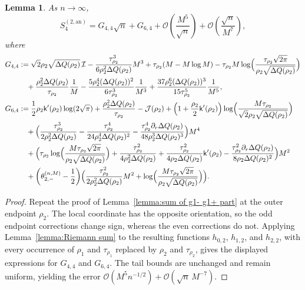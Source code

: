 \documentclass[a4paper]{article}
\newtheorem{lemma}[theorem]{Lemma}
\numberwithin{equation}{section}
\begin{document}
\begin{lemma}\label{lemma:sum of g2- part g2+part}
As $n\to\infty$,
\begin{equation}
 S_4^{(2,\mathrm{an})}
 =
 G_{4,4}\sqrt{n}+G_{6,4}+\mathcal{O}(\frac{M^5}{\sqrt{n}})+\mathcal{O}(\frac{\sqrt{n}}{M^7}),
\end{equation}
where 
\begin{align*}
G_{4,4}&:=    
\sqrt{2}\rho_2\sqrt{\Delta Q(\rho_2)}\,\mathcal{I}
-\frac{\tau_{\rho_2}^3}{6\rho_2^2\Delta Q(\rho_2)}M^3
+\tau_{\rho_2}(M-M\log M)-\tau_{\rho_2}M\log\Bigl(\frac{\tau_{\rho_2}\sqrt{2\pi}}{\rho_2\sqrt{\Delta Q(\rho_2)}}\Bigr)
\\
&\quad 
+\frac{\rho_2^2\Delta Q(\rho_2)}{\tau_{\rho_2}}\frac{1}{M}
-\frac{5\rho_2^4(\Delta Q(\rho_2))^2}{6\tau_{\rho_2}^3}\frac{1}{M^3}
+\frac{37\rho_2^6(\Delta Q(\rho_2))^3}{15\tau_{\rho_2}^5}\frac{1}{M^5},
\\
G_{6,4}&:=
\frac{1}{2}\rho_2\mathsf{k}'(\rho_2)\log(2\sqrt{\pi})
+
\frac{\rho_2^2\Delta Q(\rho_2)}{\tau_{\rho_2}}
-\mathcal{J}(\rho_2)
+
\Bigl( 
1+\frac{\rho_2}{2}\mathsf{k}'(\rho_2)
\Bigr)
\log\Bigl(\frac{M\tau_{\rho_2}}{\sqrt{2}\rho_2\sqrt{\Delta Q(\rho_2)}}\Bigr)
\\
&\quad
+\Bigl(
\frac{\tau_{\rho_2}^3}{2\rho_2^2\Delta Q(\rho_2)}
-\frac{\tau_{\rho_2}^4}{24\rho_2^4\Delta Q(\rho_2)^2}
-\frac{\tau_{\rho_2}^4\partial_r\Delta Q(\rho_2)}{48\rho_2^3\Delta Q(\rho_2)^3}
\Bigr)M^4
\\
&\quad
+\Bigl( 
\tau_{\rho_2}\log\Bigl(\frac{M\tau_{\rho_2}\sqrt{2\pi}}{\rho_2\sqrt{\Delta Q(\rho_2)}}\Bigr)
+\frac{\tau_{\rho_2}^2}{4\rho_2^2\Delta Q(\rho_2)}
+\frac{\tau_{\rho_2}^2}{4\rho_2\Delta Q(\rho_2)}\mathsf{k}'(\rho_2)
-\frac{\tau_{\rho_2}^2\partial_r\Delta Q(\rho_2)}{8\rho_2\Delta Q(\rho_2)^2}
\Bigr)M^2
\\
&\quad
+\bigg(\theta_{2,-}^{(n,M)} -\frac{1}{2} \bigg)
\Bigl(\frac{\tau_{\rho_2}^2}{2\rho_2^2\Delta Q(\rho_2)}M^2
+\log\Bigl(\frac{M\tau_{\rho_2}\sqrt{2\pi}}{\rho_2\sqrt{\Delta Q(\rho_2)}}\Bigr)\Bigr).
\end{align*}

\end{lemma}


\begin{proof}
Repeat the proof of Lemma~\ref{lemma:sum of g1- g1+ part} at the outer endpoint $\rho_2$. The local coordinate has the opposite orientation, so the odd endpoint corrections change sign, whereas the even corrections do not. Applying Lemma~\ref{lemma:Riemann sum} to the resulting functions $h_{0,2}$, $h_{1,2}$, and $h_{2,2}$, with every occurrence of $\rho_1$ and $\tau_{\rho_1}$ replaced by $\rho_2$ and $\tau_{\rho_2}$, gives the displayed expressions for $G_{4,4}$ and $G_{6,4}$. The tail bounds are unchanged and remain uniform, yielding the error $\mathcal O(M^5n^{-1/2})+\mathcal O(\sqrt n\,M^{-7})$.
\end{proof}
\end{document}
